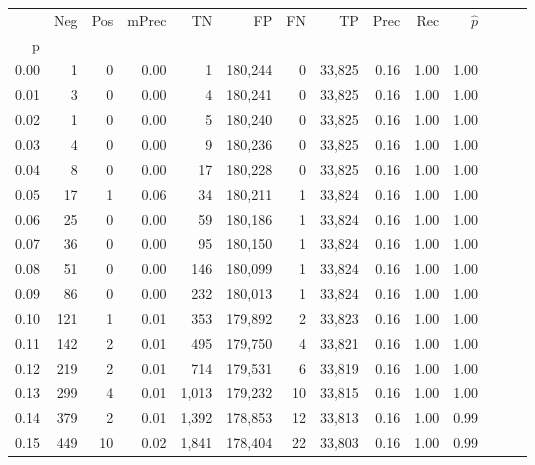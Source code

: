 \begin{tabular}{rrrrrrrrrrrrrr}
\toprule
{} &    Neg &    Pos & mPrec &       TN &       FP &      FN &      TP &  Prec &   Rec & $\hat{p}$ \\
p    &        &        &       &          &          &         &         &       &       &           \\
\midrule
0.00 &      1 &      0 &  0.00 &        1 &  180,244 &       0 &  33,825 &  0.16 &  1.00 &      1.00 \\
0.01 &      3 &      0 &  0.00 &        4 &  180,241 &       0 &  33,825 &  0.16 &  1.00 &      1.00 \\
0.02 &      1 &      0 &  0.00 &        5 &  180,240 &       0 &  33,825 &  0.16 &  1.00 &      1.00 \\
0.03 &      4 &      0 &  0.00 &        9 &  180,236 &       0 &  33,825 &  0.16 &  1.00 &      1.00 \\
0.04 &      8 &      0 &  0.00 &       17 &  180,228 &       0 &  33,825 &  0.16 &  1.00 &      1.00 \\
0.05 &     17 &      1 &  0.06 &       34 &  180,211 &       1 &  33,824 &  0.16 &  1.00 &      1.00 \\
0.06 &     25 &      0 &  0.00 &       59 &  180,186 &       1 &  33,824 &  0.16 &  1.00 &      1.00 \\
0.07 &     36 &      0 &  0.00 &       95 &  180,150 &       1 &  33,824 &  0.16 &  1.00 &      1.00 \\
0.08 &     51 &      0 &  0.00 &      146 &  180,099 &       1 &  33,824 &  0.16 &  1.00 &      1.00 \\
0.09 &     86 &      0 &  0.00 &      232 &  180,013 &       1 &  33,824 &  0.16 &  1.00 &      1.00 \\
0.10 &    121 &      1 &  0.01 &      353 &  179,892 &       2 &  33,823 &  0.16 &  1.00 &      1.00 \\
0.11 &    142 &      2 &  0.01 &      495 &  179,750 &       4 &  33,821 &  0.16 &  1.00 &      1.00 \\
0.12 &    219 &      2 &  0.01 &      714 &  179,531 &       6 &  33,819 &  0.16 &  1.00 &      1.00 \\
0.13 &    299 &      4 &  0.01 &    1,013 &  179,232 &      10 &  33,815 &  0.16 &  1.00 &      1.00 \\
0.14 &    379 &      2 &  0.01 &    1,392 &  178,853 &      12 &  33,813 &  0.16 &  1.00 &      0.99 \\
0.15 &    449 &     10 &  0.02 &    1,841 &  178,404 &      22 &  33,803 &  0.16 &  1.00 &      0.99 \\

\end{tabular}
